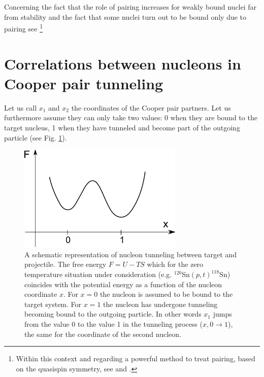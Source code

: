 Concerning the fact that the role of pairing increases for weakly bound nuclei far from stability and the fact that some nuclei turn out to be bound only due to pairing see \cite{Zelevinsky:04}\footnote{Within this context and regarding a powerful method to treat pairing, based on the quasispin symmetry, see \cite{Volya:01} and \cite{Zelevinsky:03}.}




\section[Correlations in Cooper pair tunneling]{Correlations between nucleons in Cooper pair tunneling}\label{C3S3}
Let us call $x_1$ and $x_2$ the coordinates of the Cooper pair partners. Let us furthermore assume they can only take two values: 0 when they are bound to the target nucleus, 1 when they have tunneled and become part of the outgoing particle (see Fig. \ref{fig3.3.1}).
\begin{figure}
\centerline{\includegraphics*[width=0.7\textwidth,angle=0]{nutshell/figs/fig3_3_1.pdf}}
\caption{A schematic representation of nucleon tunneling between target and projectile. The free energy $F=U-TS$ which for the zero temperature situation under consideration (e.g. $^{120}$Sn$(p,t)^{118}$Sn) coincides with the potential energy as a function of the nucleon coordinate $x$. For $x=0$ the nucleon is assumed to be bound to the target system. For $x=1$ the nucleon has undergone tunneling becoming bound to the outgoing particle. In other words $x_1$ jumps from the value 0 to the value 1 in the tunneling process ($x, 0\rightarrow 1$), the same for the coordinate of the second nucleon.}\label{fig3.3.1}
\end{figure}

